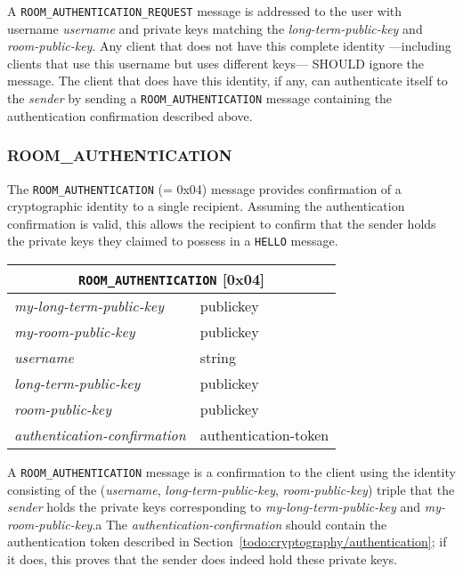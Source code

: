 \documentclass{article}
\def\message#1{\texttt{#1}}
\def\field#1{\textit{#1}}
\newenvironment{basicmessage}[2]{
\newcommand{\messagefield}[2]{
\field{##1} & \textsf{##2} \\
\hline
}
\begin{tabular}{|l|l|}
\hline
\multicolumn{2}{|c|}{\message{#1} [#2]} \\
\hline
\hline
}{
\end{tabular}
}
\begin{document}
A \message{ROOM\_AUTHENTICATION\_REQUEST} message is addressed to the user with username \field{username} and private keys matching the \field{long-term-public-key} and \field{room-public-key}.
Any client that does not have this complete identity ---including clients that use this username but uses different keys--- SHOULD ignore the message.
The client that does have this identity, if any, can authenticate itself to the \field{sender} by sending a \message{ROOM\_AUTHENTICATION} message containing the authentication confirmation described above.


\subsubsection{ROOM\_AUTHENTICATION}
\label{sec:messages/room-authentication}

The \message{ROOM\_AUTHENTICATION} (= 0x04) message provides confirmation of a cryptographic identity to a single recipient.
Assuming the authentication confirmation is valid, this allows the recipient to confirm that the sender holds the private keys they claimed to possess in a \message{HELLO} message.

\begin{basicmessage}{ROOM\_AUTHENTICATION}{0x04}
\messagefield{my-long-term-public-key}{publickey}
\messagefield{my-room-public-key}{publickey}
\messagefield{username}{string}
\messagefield{long-term-public-key}{publickey}
\messagefield{room-public-key}{publickey}
\messagefield{authentication-confirmation}{authentication-token}
\end{basicmessage}

A \message{ROOM\_AUTHENTICATION} message is a confirmation to the client using the identity consisting of the (\field{username}, \field{long-term-public-key}, \field{room-public-key}) triple that the \field{sender} holds the private keys corresponding to \field{my-long-term-public-key} and \field{my-room-public-key}.a
The \emph{authentication-confirmation} should contain the authentication token described in Section~\ref{todo:cryptography/authentication}; if it does, this proves that the sender does indeed hold these private keys.
\end{document}
